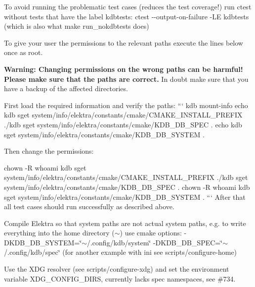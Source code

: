 \begin{DoxyEnumerate}
\item To avoid running the problematic test cases (reduces the test coverage!) run {\ttfamily ctest} without tests that have the label {\ttfamily kdbtests}\+: {\ttfamily ctest -\/-\/output-\/on-\/failure -\/\+LE kdbtests} (which is also what {\ttfamily make run\+\_\+nokdbtests} does)
\item To give your user the permissions to the relevant paths execute the lines below once as root.

{\bfseries Warning\+: Changing permissions on the wrong paths can be harmful! Please make sure that the paths are correct.} In doubt make sure that you have a backup of the affected directories.

First load the required information and verify the paths\+: ``` kdb mount-\/info echo {\ttfamily kdb sget system/info/elektra/constants/cmake/\+C\+M\+A\+K\+E\+\_\+\+I\+N\+S\+T\+A\+L\+L\+\_\+\+P\+R\+E\+F\+IX .}/{\ttfamily kdb sget system/info/elektra/constants/cmake/\+K\+D\+B\+\_\+\+D\+B\+\_\+\+S\+P\+EC .} echo {\ttfamily kdb sget system/info/elektra/constants/cmake/\+K\+D\+B\+\_\+\+D\+B\+\_\+\+S\+Y\+S\+T\+EM .} 
\begin{DoxyCode}
Then change the permissions:
\end{DoxyCode}
 chown -\/R {\ttfamily whoami} {\ttfamily kdb sget system/info/elektra/constants/cmake/\+C\+M\+A\+K\+E\+\_\+\+I\+N\+S\+T\+A\+L\+L\+\_\+\+P\+R\+E\+F\+IX .}/{\ttfamily kdb sget system/info/elektra/constants/cmake/\+K\+D\+B\+\_\+\+D\+B\+\_\+\+S\+P\+EC .} chown -\/R {\ttfamily whoami} {\ttfamily kdb sget system/info/elektra/constants/cmake/\+K\+D\+B\+\_\+\+D\+B\+\_\+\+S\+Y\+S\+T\+EM .} ``` After that all test cases should run successfully as described above.
\item Compile Elektra so that system paths are not actual system paths, e.\+g. to write everything into the home directory ({\ttfamily $\sim$}) use cmake options\+: {\ttfamily -\/\+D\+K\+D\+B\+\_\+\+D\+B\+\_\+\+S\+Y\+S\+T\+EM=\char`\"{}$\sim$/.\+config/kdb/system\char`\"{} -\/\+D\+K\+D\+B\+\_\+\+D\+B\+\_\+\+S\+P\+EC=\char`\"{}$\sim$/.\+config/kdb/spec\char`\"{}} (for another example with ini see {\ttfamily scripts/configure-\/home})
\item Use the X\+DG resolver (see {\ttfamily scripts/configure-\/xdg}) and set the environment variable {\ttfamily X\+D\+G\+\_\+\+C\+O\+N\+F\+I\+G\+\_\+\+D\+I\+RS}, currently lacks {\ttfamily spec} namespaces, see \#734.
\end{DoxyEnumerate}

